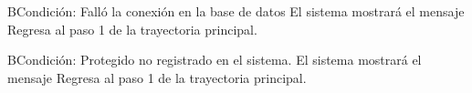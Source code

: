 	\begin{UCtrayectoriaA}{B}{Condición: Falló la conexión en la base de datos}
		\UCpaso[\UCsist] El sistema mostrará el mensaje 
		\UCpaso[\UCsist] Regresa al paso 1 de la trayectoria principal. 
	\end{UCtrayectoriaA}

	\begin{UCtrayectoriaA}{B}{Condición: Protegido no registrado en el sistema.}
		\UCpaso[\UCsist] El sistema mostrará el mensaje 
		\UCpaso[\UCsist] Regresa al paso 1 de la trayectoria principal. 
	\end{UCtrayectoriaA}
